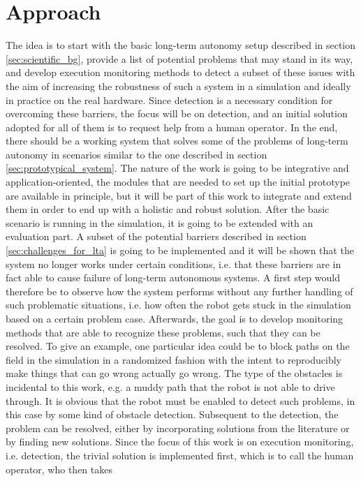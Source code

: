 \documentclass[english, master, expose, utf8]{base/thesis_KBS}
\begin{document}
\section{Approach}

The idea is to start with the basic long-term autonomy setup described in section \ref{sec:scientific_bg}, provide a list of potential problems that may 
stand in its way, and develop execution monitoring methods to detect a subset of these issues with the aim of increasing the robustness of such a system in a simulation
and ideally in practice on the real hardware.
Since detection is a necessary condition for overcoming these barriers, the focus will be on detection, and an initial solution adopted for all of them
is to request help from a human operator. In the end, there should be a working system that solves some of the problems of long-term autonomy in scenarios 
similar to the one described in section \ref{sec:prototypical_system}.
The nature of the work is going to be integrative and application-oriented, the modules that are needed to set up the initial prototype are available in principle,
but it will be part of this work to integrate and extend them in order to end up with a holistic and robust solution.
After the basic scenario is running in the simulation, it is going to be extended with an evaluation part. A subset of the potential barriers described in section 
\ref{sec:challenges_for_lta} is going to be implemented and it will be shown that the system no longer works under certain conditions, i.e. that these
barriers are in fact able to cause failure of long-term autonomous systems. A first step would therefore be to observe how the system performs without any further handling 
of such problematic situations, i.e. how often the robot gets stuck in the simulation based on a certain problem case. Afterwards, the goal is to develop monitoring methods 
that are able to recognize these problems, such that they can be resolved. To give an example, one particular idea could be to block paths on the field in the simulation 
in a randomized fashion with the intent to reproducibly make things that can go wrong actually go wrong. The type of the obstacles is incidental to this work, 
e.g. a muddy path that the robot is not able to drive through. It is obvious that the robot must be enabled to detect such problems, in this case by some kind of obstacle detection.
Subsequent to the detection, the problem can be resolved, either by incorporating solutions from the literature or by finding new solutions.
Since the focus of this work is on execution monitoring, i.e. detection, the trivial solution is implemented first, which is to call the human operator, who then takes
\end{document}
